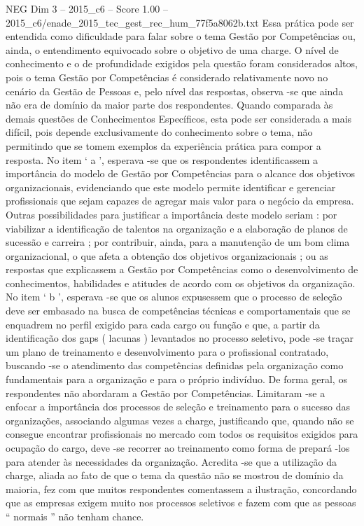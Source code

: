 \begin{textsample}{NEG Dim 3 – 2015\_c6 – Score 1.00 – 2015\_c6/enade\_2015\_tec\_gest\_rec\_hum\_77f5a8062b.txt}
Essa prática pode ser entendida como dificuldade para falar sobre o tema Gestão por Competências ou, ainda, o entendimento equivocado sobre o objetivo de uma charge.
O nível de conhecimento e o de profundidade exigidos pela questão foram considerados altos, pois o tema Gestão por Competências é considerado relativamente novo no cenário da Gestão de Pessoas e, pelo nível das respostas, observa -se que ainda não era de domínio da maior parte dos respondentes.
Quando comparada às demais questões de Conhecimentos Específicos, esta pode ser considerada a mais difícil, pois depende exclusivamente do conhecimento sobre o tema, não permitindo que se tomem exemplos da experiência prática para compor a resposta.
No item ‘ a ’, esperava -se que os respondentes identificassem a importância do modelo de Gestão por Competências para o alcance dos objetivos organizacionais, evidenciando que este modelo permite identificar e gerenciar profissionais que sejam capazes de agregar mais valor para o negócio da empresa.
Outras possibilidades para justificar a importância deste modelo seriam : por viabilizar a identificação de talentos na organização e a elaboração de planos de sucessão e carreira ; por contribuir, ainda, para a manutenção de um bom clima organizacional, o que afeta a obtenção dos objetivos organizacionais ; ou as respostas que explicassem a Gestão por Competências como o desenvolvimento de conhecimentos, habilidades e atitudes de acordo com os objetivos da organização.
No item ‘ b ’, esperava -se que os alunos expusessem que o processo de seleção deve ser embasado na busca de competências técnicas e comportamentais que se enquadrem no perfil exigido para cada cargo ou função e que, a partir da identificação dos gaps ( lacunas ) levantados no processo seletivo, pode -se traçar um plano de treinamento e desenvolvimento para o profissional contratado, buscando -se o atendimento das competências definidas pela organização como fundamentais para a organização e para o próprio indivíduo.
De forma geral, os respondentes não abordaram a Gestão por Competências.
Limitaram -se a enfocar a importância dos processos de seleção e treinamento para o sucesso das organizações, associando algumas vezes a charge, justificando que, quando não se consegue encontrar profissionais no mercado com todos os requisitos exigidos para ocupação do cargo, deve -se recorrer ao treinamento como forma de prepará -los para atender às necessidades da organização.
Acredita -se que a utilização da charge, aliada ao fato de que o tema da questão não se mostrou de domínio da maioria, fez com que muitos respondentes comentassem a ilustração, concordando que as empresas exigem muito nos processos seletivos e fazem com que as pessoas “ normais ” não tenham chance.

\end{textsample}
